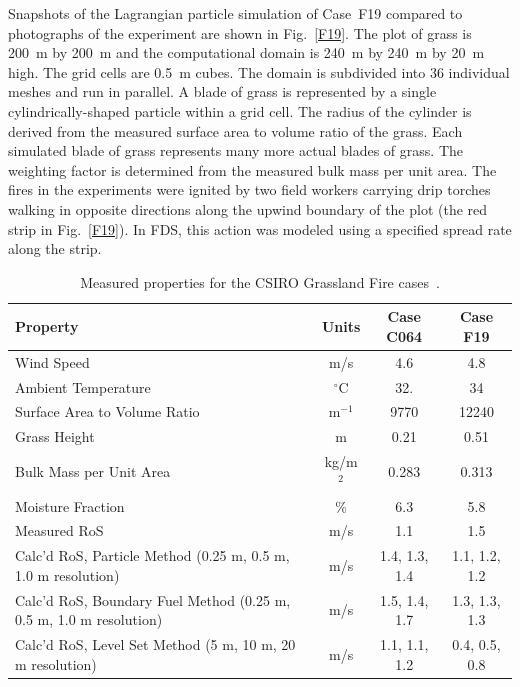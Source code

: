 \documentclass[journal,article,atmosphere,submit,moreauthors,pdftex]{Definitions/mdpi}
\begin{document}
Snapshots of the Lagrangian particle simulation of Case~F19 compared to photographs of the experiment are shown in Fig.~\ref{F19}. The plot of grass is 200~m by 200~m and the computational domain is 240~m by 240~m by 20~m high. The grid cells are 0.5~m cubes. The domain is subdivided into 36 individual meshes and run in parallel. A blade of grass is represented by a single cylindrically-shaped particle within a grid cell. The radius of the cylinder is derived from the measured surface area to volume ratio of the grass. Each simulated blade of grass represents many more actual blades of grass. The weighting factor is determined from the measured bulk mass per unit area. The fires in the experiments were ignited by two field workers carrying drip torches walking in opposite directions along the upwind boundary of the plot (the red strip in Fig.~\ref{F19}). In FDS, this action was modeled using a specified spread rate along the strip.

\begin{table}[ht]
\begin{center}
\caption[Measured properties for the CSIRO Grassland Fire cases]{Measured properties for the CSIRO Grassland Fire cases~\cite{Cheney:IJWF1993}.}
\label{Properties_Grasses}
\begin{tabular}{|l|c|c|c|}
\hline
Property                        & Units        & Case C064 & Case F19    \\ \hline \hline
Wind Speed                      & m/s          & 4.6       & 4.8         \\ \hline
Ambient Temperature             & $^\circ$C    & 32.       & 34          \\ \hline
Surface Area to Volume Ratio    & m$^{-1}$     & 9770      & 12240       \\ \hline
Grass Height                    & m            & 0.21      & 0.51        \\ \hline
Bulk Mass per Unit Area         & kg/m$^2$     & 0.283     & 0.313       \\ \hline
Moisture Fraction               & \%           & 6.3       & 5.8         \\ \hline
Measured RoS                    & m/s          & 1.1       & 1.5         \\ \hline
Calc'd RoS, Particle Method (0.25 m, 0.5 m, 1.0 m resolution) & m/s           & 1.4, 1.3, 1.4           & 1.1, 1.2, 1.2          \\ \hline
Calc'd RoS, Boundary Fuel Method (0.25 m, 0.5 m, 1.0 m resolution) & m/s      & 1.5, 1.4, 1.7           & 1.3, 1.3, 1.3           \\ \hline
Calc'd RoS, Level Set Method (5 m, 10 m, 20 m resolution) & m/s          & 1.1, 1.1, 1.2          & 0.4, 0.5, 0.8          \\ \hline
\end{tabular}
\end{center}
\end{table}
\end{document}
